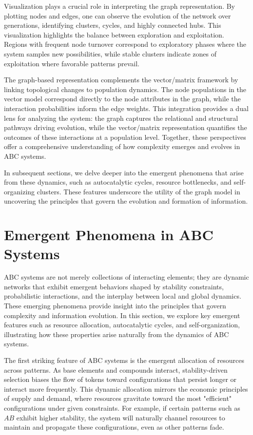 \documentclass[%
 preprint, linenumbers,
 amsmath,amssymb,
 aps, physrev,
]{revtex4-2}
\begin{document}
Visualization plays a crucial role in interpreting the graph representation. By plotting nodes and edges, one can observe the evolution of the network over generations, identifying clusters, cycles, and highly connected hubs. This visualization highlights the balance between exploration and exploitation. Regions with frequent node turnover correspond to exploratory phases where the system samples new possibilities, while stable clusters indicate zones of exploitation where favorable patterns prevail.

The graph-based representation complements the vector/matrix framework by linking topological changes to population dynamics. The node populations in the vector model correspond directly to the node attributes in the graph, while the interaction probabilities inform the edge weights. This integration provides a dual lens for analyzing the system: the graph captures the relational and structural pathways driving evolution, while the vector/matrix representation quantifies the outcomes of these interactions at a population level. Together, these perspectives offer a comprehensive understanding of how complexity emerges and evolves in ABC systems.

In subsequent sections, we delve deeper into the emergent phenomena that arise from these dynamics, such as autocatalytic cycles, resource bottlenecks, and self-organizing clusters. These features underscore the utility of the graph model in uncovering the principles that govern the evolution and formation of information.

\section{Emergent Phenomena in ABC Systems}

ABC systems are not merely collections of interacting elements; they are dynamic networks that exhibit emergent behaviors shaped by stability constraints, probabilistic interactions, and the interplay between local and global dynamics. These emerging phenomena provide insight into the principles that govern complexity and information evolution. In this section, we explore key emergent features such as resource allocation, autocatalytic cycles, and self-organization, illustrating how these properties arise naturally from the dynamics of ABC systems.

The first striking feature of ABC systems is the emergent allocation of resources across patterns. As base elements and compounds interact, stability-driven selection biases the flow of tokens toward configurations that persist longer or interact more frequently. This dynamic allocation mirrors the economic principles of supply and demand, where resources gravitate toward the most "efficient" configurations under given constraints. For example, if certain patterns such as $AB$ exhibit higher stability, the system will naturally channel resources to maintain and propagate these configurations, even as other patterns fade.
\end{document}
